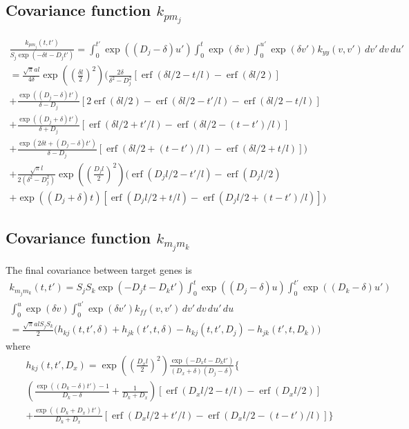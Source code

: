 \documentclass{article}
\newcommand{\erf}{\operatorname{erf}}
\begin{document}
\subsection{Covariance function $k_{pm_j}$}

\begin{multline}
  \frac{k_{p m_j}(t, t')}{S_j \exp(-\delta t - D_j t')} = 
  \int_0^{t'} \exp((D_j - \delta) u') \int_0^t \exp(\delta v) \int_0^{u'}
  \exp(\delta v') k_{yy}(v, v')\, dv'\, dv\, du' \\
  = 
  \frac{\sqrt{\pi}al}{4\delta}\exp\left(\left(\frac{\delta l}{2}\right)^2\right)
  \bigg(
  \frac{2 \delta}{\delta^2 - D_j^2}
  [\erf(\delta l / 2 - t/l) - \erf(\delta l / 2)]\\
  +
  \frac{\exp((D_j - \delta)t')}{\delta - D_j}
  [2\erf(\delta l / 2) - \erf(\delta l / 2 - t'/l) - \erf(\delta l / 2 - t/l)] \\
  +
  \frac{\exp((D_j + \delta)t')}{\delta + D_j}
  [\erf(\delta l / 2 + t'/l) - \erf(\delta l / 2 - (t-t')/l)]\\
  +
  \frac{\exp(2\delta t + (D_j - \delta)t')}{\delta - D_j}
  [\erf(\delta l / 2 + (t-t')/l) - \erf(\delta l / 2 + t/l)]
  \bigg) \\
  + \frac{\sqrt{\pi}l}{2(\delta^2 - D_j^2)}
  \exp\left(\left(\frac{D_j l}{2}\right)^2\right)
  \bigg(
  \erf(D_j l/2 - t'/l) - \erf(D_j l/2) \\
  + \exp((D_j + \delta) t) [\erf(D_j l/2 + t/l) - \erf(D_j l/2 + (t-t')/l)]
  \bigg)
\end{multline}

\subsection{Covariance function $k_{m_j m_k}$}

The final covariance between target genes is
\begin{multline}
  k_{m_j m_k}(t, t') = S_j S_k \exp(-D_j t - D_k t')
  \int_0^t \exp((D_j - \delta) u)
  \int_0^{t'} \exp((D_k - \delta) u') \\
  \int_0^u \exp(\delta v) \int_0^{u'} \exp(\delta v') k_{ff}(v, v') \, dv'\, dv\, du'\, du \\
  = \frac{\sqrt{\pi} a l S_j S_k}{2} \bigg(
  h_{kj}(t, t', \delta) + h_{jk}(t', t, \delta) 
  - h_{kj}(t, t', D_j) - h_{jk}(t', t, D_k)
  \bigg)
\end{multline}
where
\begin{multline}
  h_{kj}(t, t', D_x) = 
  \exp\left(\left(\frac{D_x l}{2}\right)^2\right)
  \frac{\exp(-D_x t - D_k t')}{(D_x + \delta) (D_j - \delta)}
  \bigg\{ 
   \\
  \left(\frac{\exp((D_k-\delta) t') - 1}{D_k-\delta} +
    \frac{1}{D_k + D_x} \right)
  [\erf(D_x l/2 - t/l) - \erf(D_x l/2)]
  \\
  + \frac{\exp((D_k+D_x)t')}{D_k+D_x}
  [\erf(D_x l/2 + t'/l)
  - \erf(D_x l/2 - (t-t')/l)]
  \bigg\} \\
\end{multline}
\end{document}
